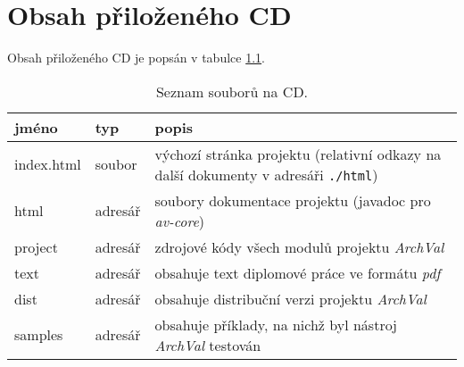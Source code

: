 \chapter{Obsah přiloženého CD}

Obsah přiloženého CD je popsán v tabulce \ref{cd_files_table}.

\begin{table}[ht]
  \centering
  \begin{tabular}{|l|l|p{20em}|}
    \hline
    jméno & typ & popis \\
    \hline
    \hline
    index.html & soubor & výchozí stránka projektu (relativní odkazy na další dokumenty v adresáři \verb+./html+) \\
    \hline
    html & adresář & soubory dokumentace projektu (javadoc pro \emph{av-core}) \\
    \hline
    project & adresář & zdrojové kódy všech modulů projektu \emph{ArchVal} \\
    \hline
    text & adresář & obsahuje text diplomové práce ve formátu \emph{pdf} \\
    \hline
    dist & adresář & obsahuje distribuční verzi projektu \emph{ArchVal} \\
    \hline
    samples & adresář & obsahuje příklady, na nichž byl nástroj \emph{ArchVal} testován \\
    \hline
  \end{tabular}
  \caption{Seznam souborů na CD. \label{cd_files_table}}
\end{table}
